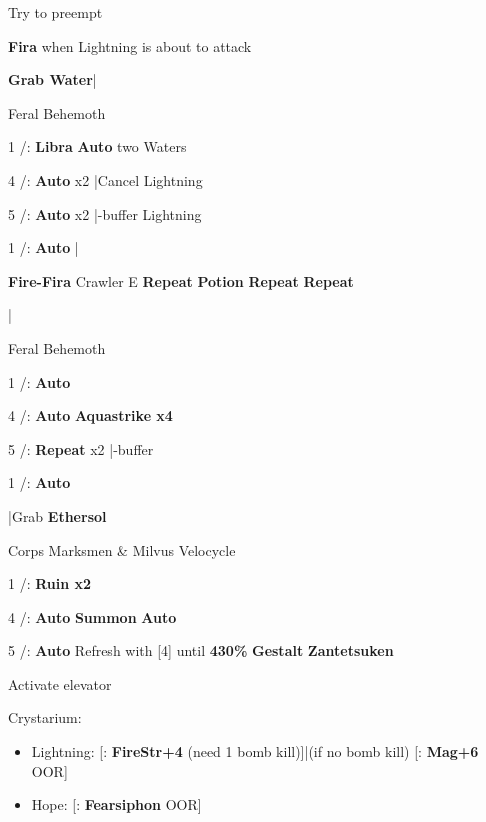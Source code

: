 \begin{mainlist}
	\item Try to preempt
	\item {} \textbf{Fira} when Lightning is about to attack
	\item \textbf{Grab Water}|\skip
\end{mainlist}
\begin{fight}{Feral Behemoth}
	\item [1] \rav/\com: \textbf{Libra} \to \textbf{Auto} two Waters
	\item [4] \rav/\rav: \textbf{Auto} x2 |Cancel Lightning
	\item [5] \rav/\rav: \textbf{Auto} x2 |\com-buffer Lightning
	\item [1] \rav/\com: \textbf{Auto} |\skip
\end{fight}
\begin{mainlist}
	\item {} \textbf{Fire-Fira} Crawler E \to [6] \textbf{Repeat} \to \textbf{\textbf{Potion}} \to \textbf{Repeat} \to [1] \textbf{Repeat}
	\item {}|
\end{mainlist}
\begin{fight}{Feral Behemoth}
	\item [1] \com/\rav: \textbf{Auto}
	\item [4] \rav/\rav: \textbf{Auto} \to \textbf{Aquastrike x4}
	\item [5] \rav/\rav: \textbf{Repeat} x2 |\com-buffer
	\item [1] \com/\rav: \textbf{Auto}
\end{fight}
\begin{mainlist}
	\item \skip|Grab \textbf{Ethersol}
\end{mainlist}
\begin{fight}{Corps Marksmen \& Milvus Velocycle}
	\item [1] \com/\rav: \textbf{Ruin x2}
	\item [4] \rav/\rav: \textbf{Auto} \to \textbf{Summon} \to \textbf{Auto}
	\item [5] \rav/\rav: \textbf{Auto} \to Refresh with [4] until \textbf{430\%} \to \textbf{Gestalt} \to \textbf{Zantetsuken}
	\item Activate elevator
\end{fight}
\begin{menu}
	\item Crystarium:
	\begin{itemize}
		\item Lightning: [\rav: \textbf{Fire}\to\textbf{Str+4} (need 1 bomb kill)]|(if no bomb kill) [\com: \textbf{Mag+6} OOR]
		\item Hope: [\rav: \textbf{Fearsiphon} OOR]
	\end{itemize}
\end{menu}
